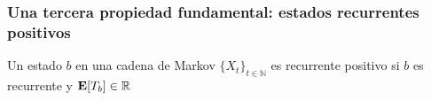\begin{frame}
\frametitle{Una tercera propiedad fundamental: estados recurrentes positivos}

{\small

\begin{definition}
Un estado $b$ en una cadena de Markov $\{ X_t \}_{t \in \mathbb{N}}$ es recurrente positivo si $b$ es recurrente y \alert{${\rm {\bf E}}[T_b] \in \mathbb{R}$}
\end{definition}



}

\end{frame}






